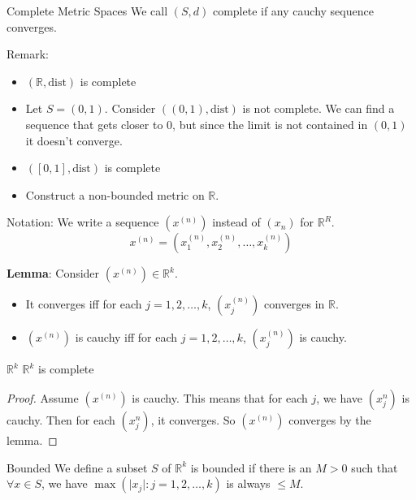 \documentclass{report}
\begin{document}
\begin{definition}{Complete Metric Spaces}
    We call $(S, d)$ complete if any cauchy sequence converges.
\end{definition}

Remark:
    \begin{itemize}
        \item  $(\mathbb{R}, \text{dist})$ is complete

        \item Let $S = (0, 1)$. Consider $((0, 1), \text{dist})$ is not complete. We can find a sequence that gets closer to $0$, but since the limit is not contained in $(0, 1)$ it doesn't converge.

        \item  $([0, 1], \text{dist})$ is complete

        \item Construct a non-bounded metric on $\mathbb{R}$. 
    \end{itemize}

Notation: We write a sequence $(x^{(n)})$ instead of $(x_{n})$ for $\mathbb{R}^{R}$. 
    \begin{equation*}
        x^{(n)} = (x_{1}^{(n)}, x_{2}^{(n)}, \ldots , x_{k}^{(n)})
    \end{equation*}

\textbf{Lemma}: Consider $(x^{(n)}) \in \mathbb{R}^{k}$. 
    \begin{itemize}
        \item It converges iff for each $j = 1, 2, \ldots , k$, $(x_{j}^{(n)})$ converges in $\mathbb{R}$.

        \item $(x^{(n)})$ is cauchy iff for each $j = 1, 2, \ldots , k$, $(x_{j}^{(n)})$ is cauchy.
    \end{itemize}

\begin{theorem}{$\mathbb{R}^{k}$}
    $\mathbb{R}^{k}$ is complete
\end{theorem}
    \begin{proof}
        Assume $(x^{(n)})$ is cauchy. This means that for each $j$, we have $(x_{j}^{n})$ is cauchy. Then for each $(x_{j}^{n})$, it converges. So $(x^{(n)})$ converges by the lemma.
    \end{proof}

\begin{definition}{Bounded}
    We define a subset $S$ of $\mathbb{R}^{k}$ is bounded if there is an $M> 0$ such that $\forall x \in S$, we have $\max(\lvert x_{j} \rvert : j = 1, 2, \ldots , k)$ is always $\leq M$.
\end{definition}
\end{document}
